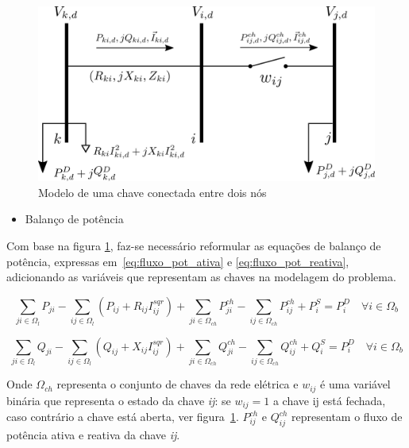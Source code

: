 \begin{figure}[H]
    \centering
    \includegraphics[scale = 1.5]{4_Modeling/diagrama_chaves.png}
    \caption{Modelo de uma chave conectada entre dois nós}
    \label{fig:diagrama_chave}
\end{figure}
    
\begin{itemize}
    \item Balanço de potência
\end{itemize}
    Com base na figura \ref{fig:diagrama_chave}, faz-se necessário reformular as equações de balanço de potência, expressas em~\ref{eq:fluxo_pot_ativa} e \ref{eq:fluxo_pot_reativa}, adicionando as variáveis que representam as chaves na modelagem do problema.

\begin{equation}
    \sum_{ji\in\Omega_{l}}P_{ji} - \sum_{ij\in\Omega_{l}}(P_{ij} + R_{ij}I_{ij}^{sqr})+ \sum_{ji\in\Omega_{ch}}P_{ji}^{ch} -\sum_{ij\in\Omega_{ch}}P_{ij}^{ch} + P_{i}^{S} = P_{i}^{D}\quad\forall i \in\Omega_{b}\label{eq:fluxo_pot_ativa_chaves}  
\end{equation}
    
    
\begin{equation}
    \sum_{ji\in\Omega_{l}}Q_{ji} - \sum_{ij\in\Omega_{l}}(Q_{ij} + X_{ij}I_{ij}^{sqr})+ \sum_{ji\in\Omega_{ch}}Q_{ji}^{ch} -\sum_{ij\in\Omega_{ch}}Q_{ij}^{ch} + Q_{i}^{S} = P_{i}^{D}\quad\forall i \in\Omega_{b}
    \label{eq:fluxo_pot_reativa_chaves}
\end{equation}
    
Onde $\Omega_{ch}$ representa o conjunto de chaves da rede elétrica e $w_{ij}$ é uma variável binária que representa o estado da chave \textit{ij}: se $w_{ij} = 1$ a chave ij está fechada, caso contrário a chave está aberta, ver figura~\ref{fig:diagrama_chave}. $P_{ij}^{ch}$ e $Q_{ij}^{ch}$ representam o fluxo de potência ativa e reativa da chave \textit{ij}.

